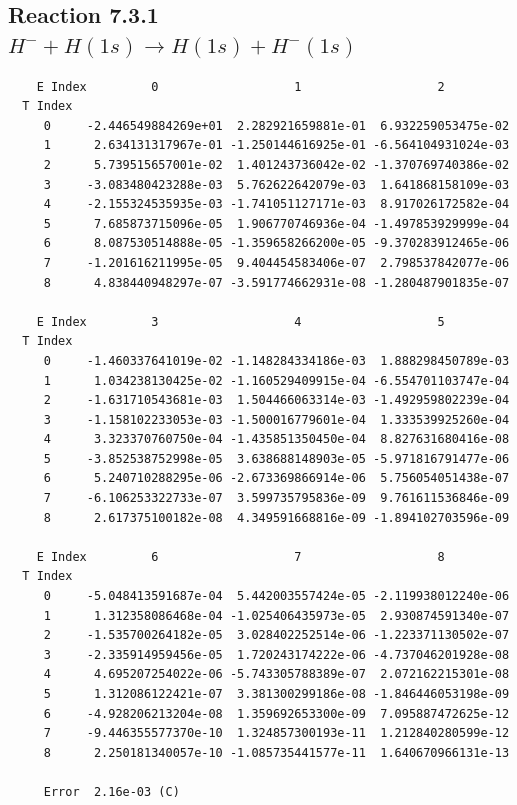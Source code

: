 \documentclass[12pt,dvipdfmx]{article}
\begin{document}
\newpage
\subsection{
Reaction 7.3.1 $   H^- + H(1s) \rightarrow H(1s) + H^-(1s)$}


\begin{small}\begin{verbatim}
    E Index         0                   1                   2
  T Index
     0     -2.446549884269e+01  2.282921659881e-01  6.932259053475e-02
     1      2.634131317967e-01 -1.250144616925e-01 -6.564104931024e-03
     2      5.739515657001e-02  1.401243736042e-02 -1.370769740386e-02
     3     -3.083480423288e-03  5.762622642079e-03  1.641868158109e-03
     4     -2.155324535935e-03 -1.741051127171e-03  8.917026172582e-04
     5      7.685873715096e-05  1.906770746936e-04 -1.497853929999e-04
     6      8.087530514888e-05 -1.359658266200e-05 -9.370283912465e-06
     7     -1.201616211995e-05  9.404454583406e-07  2.798537842077e-06
     8      4.838440948297e-07 -3.591774662931e-08 -1.280487901835e-07

    E Index         3                   4                   5
  T Index
     0     -1.460337641019e-02 -1.148284334186e-03  1.888298450789e-03
     1      1.034238130425e-02 -1.160529409915e-04 -6.554701103747e-04
     2     -1.631710543681e-03  1.504466063314e-03 -1.492959802239e-04
     3     -1.158102233053e-03 -1.500016779601e-04  1.333539925260e-04
     4      3.323370760750e-04 -1.435851350450e-04  8.827631680416e-08
     5     -3.852538752998e-05  3.638688148903e-05 -5.971816791477e-06
     6      5.240710288295e-06 -2.673369866914e-06  5.756054051438e-07
     7     -6.106253322733e-07  3.599735795836e-09  9.761611536846e-09
     8      2.617375100182e-08  4.349591668816e-09 -1.894102703596e-09

    E Index         6                   7                   8
  T Index
     0     -5.048413591687e-04  5.442003557424e-05 -2.119938012240e-06
     1      1.312358086468e-04 -1.025406435973e-05  2.930874591340e-07
     2     -1.535700264182e-05  3.028402252514e-06 -1.223371130502e-07
     3     -2.335914959456e-05  1.720243174222e-06 -4.737046201928e-08
     4      4.695207254022e-06 -5.743305788389e-07  2.072162215301e-08
     5      1.312086122421e-07  3.381300299186e-08 -1.846446053198e-09
     6     -4.928206213204e-08  1.359692653300e-09  7.095887472625e-12
     7     -9.446355577370e-10  1.324857300193e-11  1.212840280599e-12
     8      2.250181340057e-10 -1.085735441577e-11  1.640670966131e-13

     Error  2.16e-03 (C)
\end{verbatim}\end{small}
\end{document}
